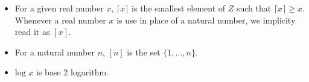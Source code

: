 \begin{definition}[title = Useful notation]
    \begin{itemize}
        \renewcommand{\labelitemi}{-}
        \item For a given real number $x$, $\lceil x \rceil$ is the smallest element of $Z$ such that $\lceil x \rceil \geq x$. Whenever a real number $x$ is use in place of a natural number, we implicity read it as $[x]$.
        \item For a natural number $n$, $[n]$ is the set $\{1, \dots, n\}$.
        \item $\text{log } x$ is base 2 logarithm.
    \end{itemize}
\end{definition}